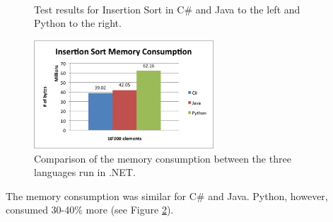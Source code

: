 \begin{figure}[h]
	\centering
	\mbox{
	}
	\caption{Test results for Insertion Sort in C\# and Java to the left and Python to the right.}
	\label{fig:insertion_sort_graphs}
\end{figure} 

\begin{figure}[h]
	\centering
	\includegraphics[width=0.6\textwidth]{chapters/media/insertion_sort_memory.png}
	\caption{Comparison of the memory consumption between the three languages run in .NET.}
	\label{fig:insertion_sort_memory}
\end{figure}

The memory consumption was similar for C\# and Java. Python, however, consumed 30-40\% more (see Figure \ref{fig:insertion_sort_memory}).




















